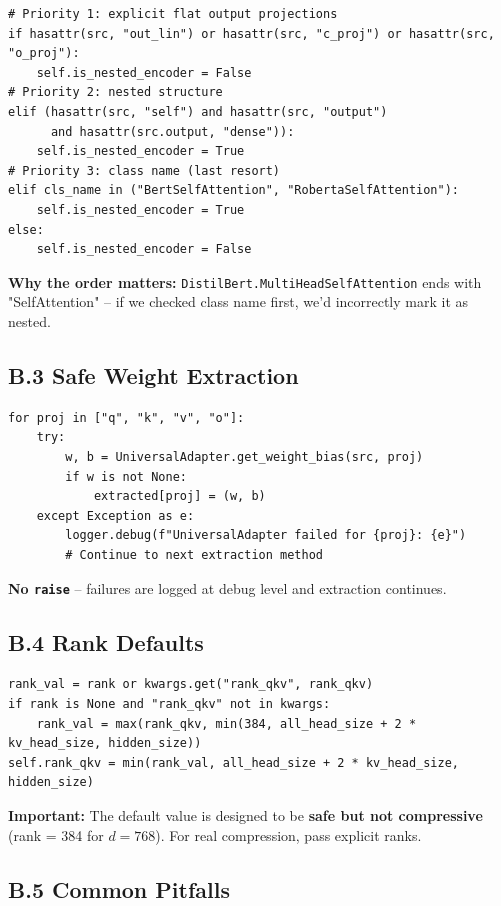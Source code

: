 \begin{lstlisting}
# Priority 1: explicit flat output projections
if hasattr(src, "out_lin") or hasattr(src, "c_proj") or hasattr(src, "o_proj"):
    self.is_nested_encoder = False
# Priority 2: nested structure
elif (hasattr(src, "self") and hasattr(src, "output") 
      and hasattr(src.output, "dense")):
    self.is_nested_encoder = True
# Priority 3: class name (last resort)
elif cls_name in ("BertSelfAttention", "RobertaSelfAttention"):
    self.is_nested_encoder = True
else:
    self.is_nested_encoder = False
\end{lstlisting}

\textbf{Why the order matters:} \texttt{DistilBert.MultiHeadSelfAttention} ends with 
"SelfAttention" -- if we checked class name first, we'd incorrectly mark it 
as nested.

\subsection{B.3 Safe Weight Extraction}

\begin{lstlisting}
for proj in ["q", "k", "v", "o"]:
    try:
        w, b = UniversalAdapter.get_weight_bias(src, proj)
        if w is not None:
            extracted[proj] = (w, b)
    except Exception as e:
        logger.debug(f"UniversalAdapter failed for {proj}: {e}")
        # Continue to next extraction method
\end{lstlisting}

\textbf{No \texttt{raise}} -- failures are logged at debug level and extraction continues.

\subsection{B.4 Rank Defaults}

\begin{lstlisting}
rank_val = rank or kwargs.get("rank_qkv", rank_qkv)
if rank is None and "rank_qkv" not in kwargs:
    rank_val = max(rank_qkv, min(384, all_head_size + 2 * kv_head_size, hidden_size))
self.rank_qkv = min(rank_val, all_head_size + 2 * kv_head_size, hidden_size)
\end{lstlisting}

\textbf{Important:} The default value is designed to be \textbf{safe but not compressive} 
(rank = 384 for $d=768$). For real compression, pass explicit ranks.

\subsection{B.5 Common Pitfalls}

